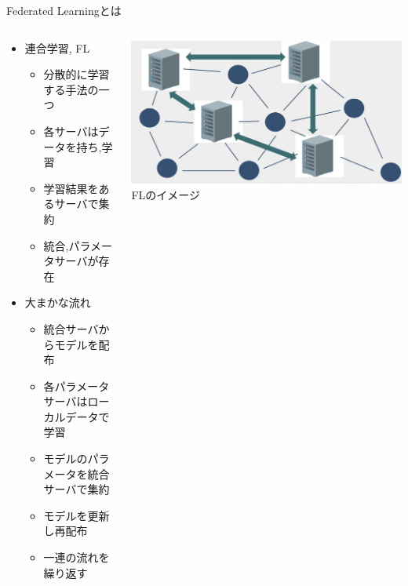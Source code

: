 \documentclass[unicode,12pt,aspectratio=169, dvipdfmx]{beamer}
\begin{document}
    \begin{frame}{Federated Learningとは}
        \begin{columns}
            \begin{column}[T]{.7\linewidth}
                \begin{itemize}
                    \item 連合学習, FL
                    \begin{itemize}
                        \item 分散的に学習する手法の一つ
                        \item 各サーバはデータを持ち,学習
                        \item 学習結果をあるサーバで集約
                        \item 統合,パラメータサーバが存在
                    \end{itemize}  
                    \item 大まかな流れ
                    \begin{itemize}
                        \item 統合サーバからモデルを配布
                        \item 各パラメータサーバはローカルデータで学習
                        \item モデルのパラメータを統合サーバで集約
                        \item モデルを更新し再配布
                        \item 一連の流れを繰り返す
                    \end{itemize}    
                \end{itemize}          
            \end{column}
            \begin{column}[T]{.5\linewidth}
                    \begin{center}
                        \includegraphics[scale=0.3]{figures/fl.png}
                        \scriptsize{FLのイメージ}
                    \end{center}
            \end{column}
        \end{columns}
    \end{frame}
\end{document}
